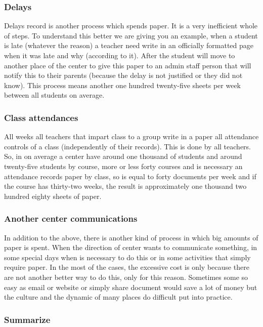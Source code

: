 \subsubsection{Delays}

Delays record is another process which spends paper. It is a very inefficient
whole of steps. To understand this better we are giving you an example, when a
student is late (whatever the reason) a teacher need write in an officially formatted
page when it was late and why (according to it).
\intro
After the student will move to another place of the center to give this paper
to an admin staff person that will
notify this to their parents (because the delay is not justified or they did not
know). This process means another one hundred twenty-five sheets per week
between all students on average.

\subsubsection{Class attendances}

All weeks all teachers that impart class to a group write in a paper
all attendance controls of a class (independently of their records). This
is done by all teachers. So, in on average a center have around one thousand of students
and around twenty-five students by course, more or less forty courses and is
necessary an attendance records paper by class, so is equal to forty documents per week and
if the course has thirty-two weeks, the result is approximately one thousand two hundred eighty
sheets of paper.

\subsubsection{Another center communications}

In addition to the above, there is another kind of process in which big amounts
of paper is spent. When the direction of center wants to communicate something,
in some special days when is necessary to do this or in some activities that
simply require paper.
In the most of the cases, the excessive cost is only because there are not another better way
to do this, only for this reason. Sometimes some so easy as email or website or
simply share document would save a lot of money but the culture and the
dynamic of many places do difficult put into practice.


\subsubsection{Summarize}

